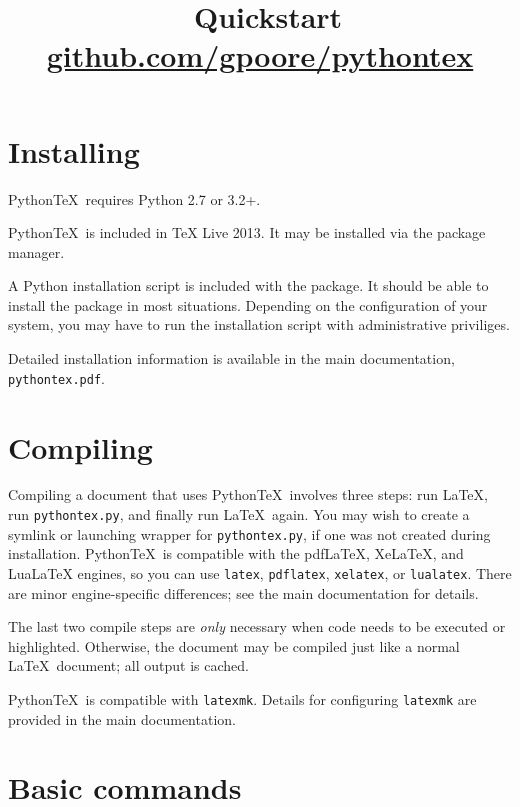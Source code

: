 \documentclass[twocolumn]{article}
\title{\vspace{-0.6in} \pytex\ Quickstart \\ {\normalsize \href{https://github.com/gpoore/pythontex}{github.com/gpoore/pythontex}}}
\author{}
\date{}
\newcommand{\pytex}{Python\TeX}
\begin{document}
\maketitle




\section*{Installing}

\pytex\ requires Python 2.7 or 3.2+.

\pytex\ is included in TeX Live 2013.  It may be installed via the package manager.

A Python installation script is included with the package.  It should be able to install the package in most situations.  Depending on the configuration of your system, you may have to run the installation script with administrative priviliges.

Detailed installation information is available in the main documentation, \texttt{pythontex.pdf}.

\section*{Compiling}

Compiling a document that uses \pytex\ involves three steps:  run \LaTeX, run \texttt{pythontex.py}, and finally run \LaTeX\ again.  You may wish to create a symlink or launching wrapper for \texttt{pythontex.py}, if one was not created during installation.  \pytex\ is compatible with the pdfLaTeX, XeLaTeX, and LuaLaTeX engines, so you can use \texttt{latex}, \texttt{pdflatex}, \texttt{xelatex}, or \texttt{lualatex}.  There are minor engine-specific differences; see the main documentation for details.

The last two compile steps are \emph{only} necessary when code needs to be executed or highlighted.  Otherwise, the document may be compiled just like a normal \LaTeX\ document; all output is cached.

\pytex\ is compatible with \texttt{latexmk}.  Details for configuring \texttt{latexmk} are provided in the main documentation.



\section*{Basic commands}
\end{document}
